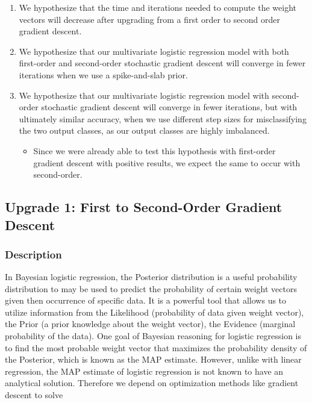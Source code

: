 \documentclass[12pt]{article}
\begin{document}
\begin{enumerate}
\item We hypothesize that the time and iterations needed to compute the weight vectors will decrease
after upgrading from a first order to second order gradient descent.

\item We hypothesize that our multivariate logistic regression model with both first-order and second-order stochastic gradient descent will converge in fewer iterations when we use a spike-and-slab prior.

\item We hypothesize that our multivariate logistic regression model with second-order stochastic gradient descent will converge in fewer iterations, but with ultimately similar accuracy, when we use different step sizes for misclassifying the two output classes, as our output classes are highly imbalanced.

	\begin{itemize}
	\item Since we were already able to test this hypothesis with first-order gradient descent with positive results, we expect the same to occur with second-order.
	\end{itemize}

\end{enumerate}


\subsection{Upgrade 1: First to Second-Order Gradient Descent}

\subsubsection{Description}
In Bayesian logistic regression, the Posterior distribution is a useful probability distribution to may be used to predict the probability of certain weight vectors given then occurrence of specific data. It is a powerful tool that allows us to utilize information from the Likelihood (probability of data given weight vector), the Prior (a prior knowledge about the weight vector), the Evidence (marginal probability of the data). One goal of Bayesian reasoning for logistic regression is to find the most probable weight vector that maximizes the probability density of the Posterior, which is known as the MAP estimate. However, unlike with linear regression, the MAP estimate of logistic regression is not known to have an analytical solution. Therefore we depend on optimization methods like gradient descent to solve
\end{document}
